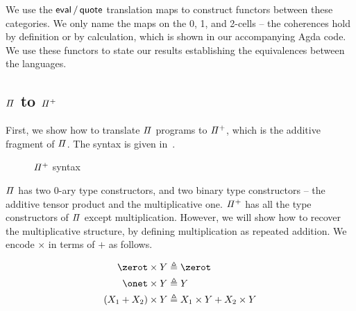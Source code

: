 We use the $\evalt/\quotet$ translation maps to construct functors between these categories. We only name the maps on
the 0, 1, and 2-cells -- the coherences hold by definition or by calculation, which is shown in our accompanying Agda
code. We use these functors to state our results establishing the equivalences between the languages.

\subsection{$\mathit{\Pi}$ to $\mathit{{\Pi}^{+}}$}

First, we show how to translate $\mathit{\Pi}$ programs to $\mathit{{\Pi}^{+}}$, which is the additive fragment of $\mathit{\Pi}$. The
syntax is given in~.

\begin{figure}[t]
  {}

  {}
  \caption{$\mathit{{\Pi}^{+}}$ syntax}
  \label{fig:piplus}
\end{figure}

$\mathit{\Pi}$ has two 0-ary type constructors, and two binary type constructors -- the additive tensor product and the
multiplicative one. $\mathit{{\Pi}^{+}}$ has all the type constructors of $\mathit{\Pi}$ except multiplication. However, we will
show how to recover the multiplicative structure, by defining multiplication as repeated addition. We encode $\times$ in
terms of $+$ as follows.

\begin{definition}[$\times : \UPlus \to \UPlus \to \UPlus$]
  \begin{align*}
    \zerot \times Y      & \defeq \zerot                      \\
    \onet \times Y       & \defeq Y                           \\
    (X_1 + X_2) \times Y & \defeq X_1 \times Y + X_2 \times Y
  \end{align*}
\end{definition}

